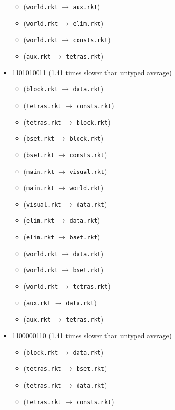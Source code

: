 \documentclass{article}
\newcommand{\mono}[1]{\texttt{#1}}
\begin{document}
\begin{itemize}
\begin{itemize}
  \item (\mono{world.rkt} $\rightarrow$ \mono{aux.rkt})
  \item (\mono{world.rkt} $\rightarrow$ \mono{elim.rkt})
  \item (\mono{world.rkt} $\rightarrow$ \mono{consts.rkt})
  \item (\mono{aux.rkt} $\rightarrow$ \mono{tetras.rkt})
  \end{itemize}
\item 1101010011 (1.41 times slower than untyped average)
  \begin{itemize}
  \item (\mono{block.rkt} $\rightarrow$ \mono{data.rkt})
  \item (\mono{tetras.rkt} $\rightarrow$ \mono{consts.rkt})
  \item (\mono{tetras.rkt} $\rightarrow$ \mono{block.rkt})
  \item (\mono{bset.rkt} $\rightarrow$ \mono{block.rkt})
  \item (\mono{bset.rkt} $\rightarrow$ \mono{consts.rkt})
  \item (\mono{main.rkt} $\rightarrow$ \mono{visual.rkt})
  \item (\mono{main.rkt} $\rightarrow$ \mono{world.rkt})
  \item (\mono{visual.rkt} $\rightarrow$ \mono{data.rkt})
  \item (\mono{elim.rkt} $\rightarrow$ \mono{data.rkt})
  \item (\mono{elim.rkt} $\rightarrow$ \mono{bset.rkt})
  \item (\mono{world.rkt} $\rightarrow$ \mono{data.rkt})
  \item (\mono{world.rkt} $\rightarrow$ \mono{bset.rkt})
  \item (\mono{world.rkt} $\rightarrow$ \mono{tetras.rkt})
  \item (\mono{aux.rkt} $\rightarrow$ \mono{data.rkt})
  \item (\mono{aux.rkt} $\rightarrow$ \mono{tetras.rkt})
  \end{itemize}
\item 1100000110 (1.41 times slower than untyped average)
  \begin{itemize}
  \item (\mono{block.rkt} $\rightarrow$ \mono{data.rkt})
  \item (\mono{tetras.rkt} $\rightarrow$ \mono{bset.rkt})
  \item (\mono{tetras.rkt} $\rightarrow$ \mono{data.rkt})
  \item (\mono{tetras.rkt} $\rightarrow$ \mono{consts.rkt})

\end{itemize}
\end{itemize}
\end{document}
